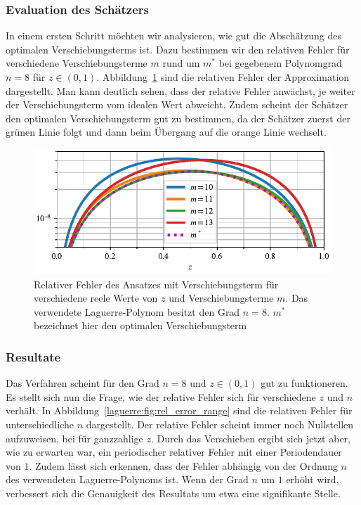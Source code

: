 \subsubsection{Evaluation des Schätzers}
In einem ersten Schritt möchten wir analysieren,
wie gut die Abschätzung des optimalen Verschiebungsterms ist.
Dazu bestimmen wir den relativen Fehler für verschiedene Verschiebungsterme $m$
rund um $m^*$ bei gegebenem Polynomgrad $n = 8$ für $z \in (0, 1)$.
Abbildung~\ref{laguerre:fig:rel_error_shifted} sind die relativen Fehler
der Approximation dargestellt.
Man kann deutlich sehen,
dass der relative Fehler anwächst,
je weiter der Verschiebungsterm vom idealen Wert abweicht.
Zudem scheint der Schätzer den optimalen Verschiebungsterm gut zu bestimmen,
da der Schätzer zuerst der grünen Linie folgt und
dann beim Übergang auf die orange Linie wechselt.
\begin{figure}
\centering
% 
\includegraphics{papers/laguerre/images/rel_error_shifted.pdf}
\caption{Relativer Fehler des Ansatzes mit Verschiebungsterm
für verschiedene reele Werte von $z$ und Verschiebungsterme $m$.
Das verwendete Laguerre-Polynom besitzt den Grad $n = 8$.
$m^*$ bezeichnet hier den optimalen Verschiebungsterm}
\label{laguerre:fig:rel_error_shifted}
\end{figure}

\subsubsection{Resultate}
Das Verfahren scheint für den Grad $n=8$ und $z \in (0,1)$ gut zu funktioneren.
Es stellt sich nun die Frage,
wie der relative Fehler sich für verschiedene $z$ und $n$ verhält.
In Abbildung~\ref{laguerre:fig:rel_error_range} sind die relativen Fehler für
unterschiedliche $n$ dargestellt.
Der relative Fehler scheint immer noch Nullstellen aufzuweisen,
bei für ganzzahlige $z$.
Durch das Verschieben ergibt sich jetzt aber,
wie zu erwarten war,
ein periodischer relativer Fehler mit einer Periodendauer von $1$.
Zudem lässt sich erkennen,
dass der Fehler abhängig von der Ordnung $n$
des verwendeten Laguerre-Polynoms ist.
Wenn der Grad $n$ um $1$ erhöht wird,
verbessert sich die Genauigkeit des Resultats um etwa eine signifikante Stelle.

